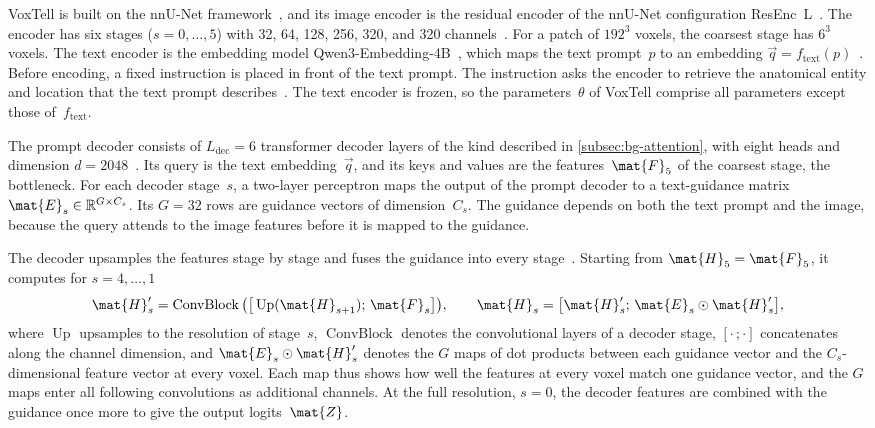 VoxTell is built on the nnU-Net framework~\cite[Suppl.~Sec.~A]{rokuss2025voxtellfreetextpromptableuniversal}, and its image encoder is the residual encoder of the nnU-Net configuration ResEnc~L~\cite[Sec.~3.1]{isensee2024nnunetrevisited}.
The encoder has six stages ($s = 0, \dots, 5$) with 32, 64, 128, 256, 320, and 320 channels~\cite[Suppl.~Sec.~A.2]{rokuss2025voxtellfreetextpromptableuniversal}.
For a patch of $192^3$ voxels, the coarsest stage has $6^3$ voxels.
The text encoder is the embedding model Qwen3-Embedding-4B~\cite{zhang2025qwen3embedding}, which maps the text prompt~$p$ to an embedding $\vec{q} = f_{\mathrm{text}}(p)$~\cite[Eq.~2]{rokuss2025voxtellfreetextpromptableuniversal}.
Before encoding, a fixed instruction is placed in front of the text prompt.
The instruction asks the encoder to retrieve the anatomical entity and location that the text prompt describes~\cite[Suppl.~Sec.~A.2]{rokuss2025voxtellfreetextpromptableuniversal}.
The text encoder is frozen, so the parameters~$\theta$ of VoxTell comprise all parameters except those of~$f_{\mathrm{text}}$.

The prompt decoder consists of $L_{\mathrm{dec}} = 6$ transformer decoder layers of the kind described in \cref{subsec:bg-attention}, with eight heads and dimension $d = 2048$~\cite[Sec.~3, Eq.~3, Suppl.~Sec.~A.2]{rokuss2025voxtellfreetextpromptableuniversal}.
Its query is the text embedding~$\vec{q}$, and its keys and values are the features~$\mat{F}_5$ of the coarsest stage, the bottleneck.
For each decoder stage~$s$, a two-layer perceptron maps the output of the prompt decoder to a text-guidance matrix $\mat{E}_s \in \mathbb{R}^{G \times C_s}$.
Its $G = 32$ rows are guidance vectors of dimension~$C_s$.
The guidance depends on both the text prompt and the image, because the query attends to the image features before it is mapped to the guidance.

The decoder upsamples the features stage by stage and fuses the guidance into every stage~\cite[Eqs.~4--6]{rokuss2025voxtellfreetextpromptableuniversal}.
Starting from $\mat{H}_5 = \mat{F}_5$, it computes for $s = 4, \dots, 1$
\begin{equation}
\mat{H}'_s = \operatorname{ConvBlock}\big(\big[\operatorname{Up}(\mat{H}_{s+1});\, \mat{F}_s\big]\big),
\qquad
\mat{H}_s = \big[\mat{H}'_s;\, \mat{E}_s \odot \mat{H}'_s\big],
\label{eq:bg-voxtell-fusion}
\end{equation}
where $\operatorname{Up}$ upsamples to the resolution of stage~$s$, $\operatorname{ConvBlock}$ denotes the convolutional layers of a decoder stage, $[\cdot\,;\cdot]$ concatenates along the channel dimension, and $\mat{E}_s \odot \mat{H}'_s$ denotes the $G$ maps of dot products between each guidance vector and the $C_s$-dimensional feature vector at every voxel.
Each map thus shows how well the features at every voxel match one guidance vector, and the $G$ maps enter all following convolutions as additional channels.
At the full resolution, $s = 0$, the decoder features are combined with the guidance once more to give the output logits~$\mat{Z}$.

